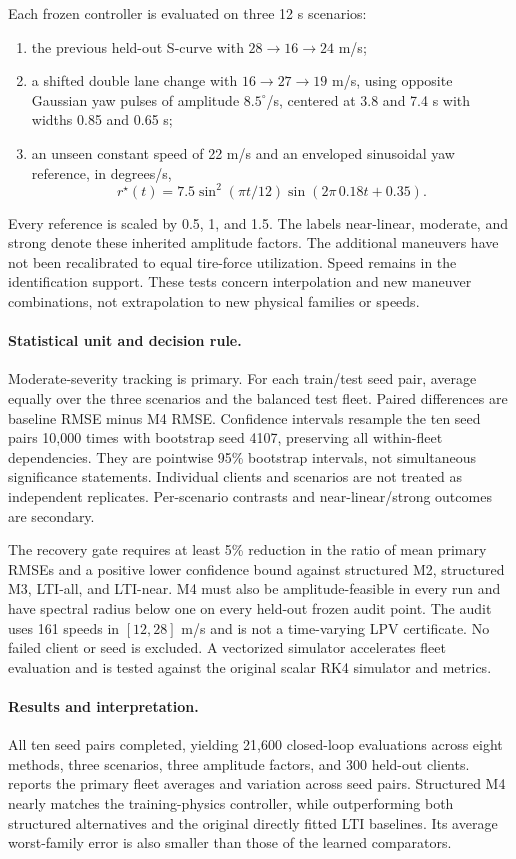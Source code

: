 Each frozen controller is evaluated on three 12 s scenarios:
\begin{enumerate}
\item the previous held-out S-curve with $28\rightarrow16\rightarrow24$ m/s;
\item a shifted double lane change with $16\rightarrow27\rightarrow19$ m/s,
using opposite Gaussian yaw pulses of amplitude $8.5^\circ$/s, centered at
3.8 and 7.4 s with widths 0.85 and 0.65 s;
\item an unseen constant speed of 22 m/s and an enveloped sinusoidal yaw
reference, in degrees/s,
\[
 r^\star(t)=7.5\sin^2(\pi t/12)\sin(2\pi\,0.18t+0.35).
\]
\end{enumerate}
Every reference is scaled by 0.5, 1, and 1.5. The labels near-linear, moderate,
and strong denote these inherited amplitude factors. The additional maneuvers
have not been recalibrated to equal tire-force utilization. Speed remains in
the identification support. These tests concern interpolation and new maneuver
combinations, not extrapolation to new physical families or speeds.

\paragraph{Statistical unit and decision rule.}
Moderate-severity tracking is primary. For each train/test seed pair, average
equally over the three scenarios and the balanced test fleet. Paired differences
are baseline RMSE minus M4 RMSE. Confidence intervals resample the ten seed pairs
10,000 times with bootstrap seed 4107, preserving all within-fleet dependencies.
They are pointwise 95\% bootstrap intervals, not simultaneous significance
statements. Individual clients and scenarios are not treated as independent
replicates. Per-scenario contrasts and near-linear/strong outcomes are secondary.

The recovery gate requires at least 5\% reduction in the ratio of mean primary
RMSEs and a positive lower confidence bound against structured M2, structured
M3, LTI-all, and LTI-near. M4 must also be amplitude-feasible in every run and
have spectral radius below one on every held-out frozen audit point. The audit
uses 161 speeds in $[12,28]$ m/s and is not a time-varying LPV certificate.
No failed client or seed is excluded. A vectorized simulator accelerates fleet
evaluation and is tested against the original scalar RK4 simulator and metrics.

\paragraph{Results and interpretation.}
All ten seed pairs completed, yielding 21,600 closed-loop evaluations across
eight methods, three scenarios, three amplitude factors, and 300 held-out
clients.  reports the primary fleet averages and
variation across seed pairs. Structured M4 nearly matches the training-physics
controller, while outperforming both structured alternatives and the original
directly fitted LTI baselines. Its average worst-family error is also smaller
than those of the learned comparators.

